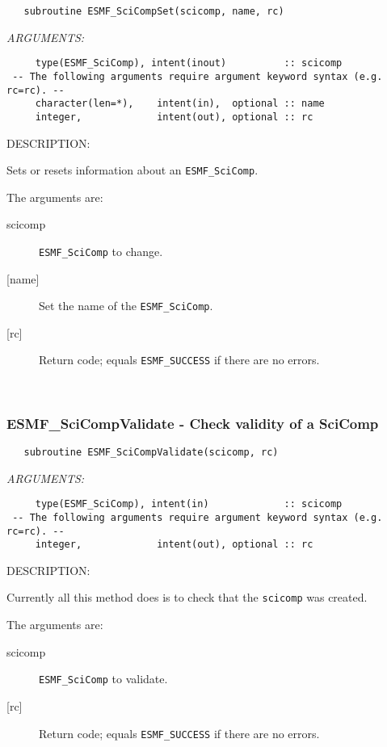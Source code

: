   
\begin{verbatim}   subroutine ESMF_SciCompSet(scicomp, name, rc)\end{verbatim}{\em ARGUMENTS:}
\begin{verbatim}     type(ESMF_SciComp), intent(inout)          :: scicomp
 -- The following arguments require argument keyword syntax (e.g. rc=rc). --
     character(len=*),    intent(in),  optional :: name
     integer,             intent(out), optional :: rc\end{verbatim}
{\sf DESCRIPTION:\\ }


   Sets or resets information about an {\tt ESMF\_SciComp}.
  
   The arguments are:
   \begin{description}
   \item[scicomp]
     {\tt ESMF\_SciComp} to change.
   \item[{[name]}]
     Set the name of the {\tt ESMF\_SciComp}.
   \item[{[rc]}]
     Return code; equals {\tt ESMF\_SUCCESS} if there are no errors.
   \end{description}
   
 
\mbox{}\hrulefill\ 
 
\subsubsection [ESMF\_SciCompValidate] {ESMF\_SciCompValidate - Check validity of a SciComp}


  
\begin{verbatim}   subroutine ESMF_SciCompValidate(scicomp, rc)\end{verbatim}{\em ARGUMENTS:}
\begin{verbatim}     type(ESMF_SciComp), intent(in)             :: scicomp
 -- The following arguments require argument keyword syntax (e.g. rc=rc). --
     integer,             intent(out), optional :: rc\end{verbatim}
{\sf DESCRIPTION:\\ }


   Currently all this method does is to check that the {\tt scicomp}
   was created.
  
   The arguments are:
   \begin{description}
   \item[scicomp]
     {\tt ESMF\_SciComp} to validate.
   \item[{[rc]}]
     Return code; equals {\tt ESMF\_SUCCESS} if there are no errors.
   \end{description}
  
\setlength{\parskip}{\oldparskip}
\setlength{\parindent}{\oldparindent}
\setlength{\baselineskip}{\oldbaselineskip}
